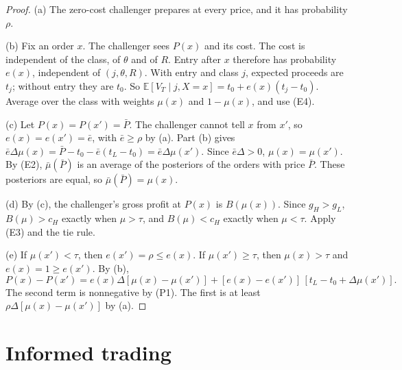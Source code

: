 \documentclass[11pt]{article}
\theoremstyle{definition}
\newcommand{\E}{\mathbb E}
\begin{document}
\begin{proof}
(a) The zero-cost challenger prepares at every price, and it has probability $\rho$.

(b) Fix an order $x$. The challenger sees $P(x)$ and its cost. The cost is independent of the class, of $\theta$
and of $R$. Entry after $x$ therefore has probability $e(x)$, independent of $(j,\theta,R)$. With entry and
class $j$, expected proceeds are $t_j$; without entry they are $t_0$. So
$\E[V_T\mid j,X=x]=t_0+e(x)(t_j-t_0)$. Average over the class with weights $\mu(x)$ and $1-\mu(x)$, and use (E4).

(c) Let $P(x)=P(x')=\bar P$. The challenger cannot tell $x$ from $x'$, so $e(x)=e(x')=\bar e$, with $\bar e\ge\rho$
by (a). Part (b) gives $\bar e\Delta\mu(x)=\bar P-t_0-\bar e(t_L-t_0)=\bar e\Delta\mu(x')$. Since
$\bar e\Delta>0$, $\mu(x)=\mu(x')$. By (E2), $\bar\mu(\bar P)$ is an average of the posteriors of the orders with
price $\bar P$. These posteriors are equal, so $\bar\mu(\bar P)=\mu(x)$.

(d) By (c), the challenger's gross profit at $P(x)$ is $B(\mu(x))$. Since $g_H>g_L$, $B(\mu)>c_H$ exactly when
$\mu>\tau$, and $B(\mu)<c_H$ exactly when $\mu<\tau$. Apply (E3) and the tie rule.

(e) If $\mu(x')<\tau$, then $e(x')=\rho\le e(x)$. If $\mu(x')\ge\tau$, then $\mu(x)>\tau$ and $e(x)=1\ge e(x')$.
By (b),
\[
P(x)-P(x')=e(x)\Delta[\mu(x)-\mu(x')]+[e(x)-e(x')]\,[t_L-t_0+\Delta\mu(x')].
\]
The second term is nonnegative by (P1). The first is at least $\rho\Delta[\mu(x)-\mu(x')]$ by (a).
\end{proof}

\section{Informed trading}\label{sec:trading}
\end{document}
